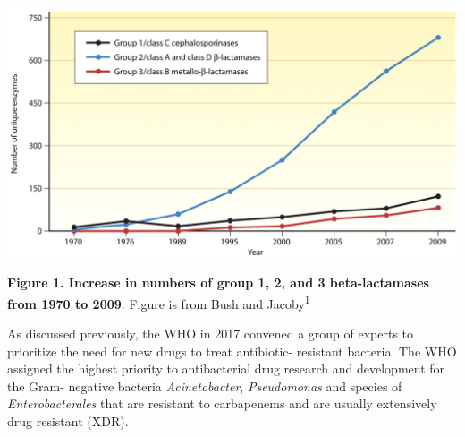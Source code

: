\documentclass[
]{book}
\begin{document}
\includegraphics[width=6.25in,height=\textheight]{images/betalactamases.png}

\textbf{Figure 1. Increase in numbers of group 1, 2, and 3 beta-lactamases from 1970 to 2009}. Figure is from Bush and Jacoby\textsuperscript{1}

As discussed previously, the WHO in 2017 convened a group of experts to prioritize the need for new drugs to treat antibiotic- resistant bacteria. The WHO assigned the highest priority to antibacterial drug research and development for the Gram- negative bacteria \emph{Acinetobacter}, \emph{Pseudomonas} and species of \emph{Enterobacterales} that are resistant to carbapenems and are usually extensively drug resistant (XDR).
\end{document}
